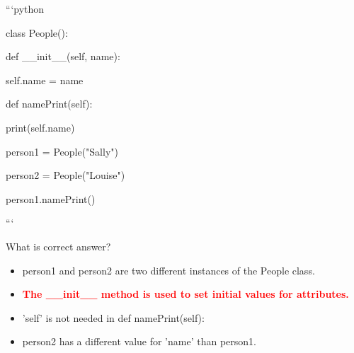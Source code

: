 \documentclass[12pt,a4paper]{article}
\begin{document}
\newline
\newline

\newline
```python\newline

\newline
class People():\newline

\newline
    def __init__(self, name):\newline

\newline
        self.name = name\newline

\newline
\newline

\newline
    def namePrint(self):\newline

\newline
        print(self.name)\newline

\newline
\newline

\newline
person1 = People("Sally")\newline

\newline
person2 = People("Louise")\newline

\newline
person1.namePrint()\newline

\newline
```\newline

\newline
\newline

\newline
What is correct answer?

\begin{itemize}
    \item[\textbf{A.}] person1 and person2 are two different instances of the People class.
    \item[\textbf{B.}] \textcolor{red}{\textbf{The __init__ method is used to set initial values for attributes.}}
    \item[\textbf{C.}] 'self' is not needed in def namePrint(self):
    \item[\textbf{D.}] person2 has a different value for 'name' than person1.
\end{itemize}
\end{document}
